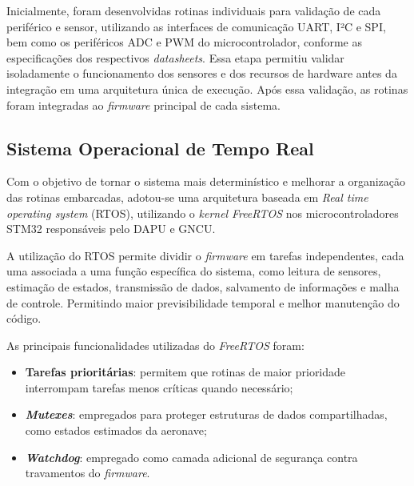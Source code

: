 Inicialmente, foram desenvolvidas rotinas individuais para validação de cada periférico e sensor, utilizando as interfaces de comunicação UART, I²C e SPI, bem como os periféricos ADC e PWM do microcontrolador, conforme as especificações dos respectivos \textit{datasheets}. Essa etapa permitiu validar isoladamente o funcionamento dos sensores e dos recursos de hardware antes da integração em uma arquitetura única de execução. Após essa validação, as rotinas foram integradas ao \textit{firmware} principal de cada sistema.

\subsection{Sistema Operacional de Tempo Real}

Com o objetivo de tornar o sistema mais determinístico e melhorar a organização das rotinas embarcadas, adotou-se uma arquitetura baseada em \textit{Real time operating system} (RTOS), utilizando o \textit{kernel} \textit{FreeRTOS} nos microcontroladores STM32 responsáveis pelo DAPU e GNCU.

A utilização do RTOS permite dividir o \textit{firmware} em tarefas independentes, cada uma associada a uma função específica do sistema, como leitura de sensores, estimação de estados, transmissão de dados, salvamento de informações e malha de controle. Permitindo maior previsibilidade temporal e melhor manutenção do código.

As principais funcionalidades utilizadas do \textit{FreeRTOS} foram:

\begin{itemize}
    \item \textbf{Tarefas prioritárias}: permitem que rotinas de maior prioridade interrompam tarefas menos críticas quando necessário;
    \item \textbf{\textit{Mutexes}}: empregados para proteger estruturas de dados compartilhadas, como estados estimados da aeronave;
    \item \textbf{\textit{Watchdog}}: empregado como camada adicional de segurança contra travamentos do \textit{firmware}.
\end{itemize}

